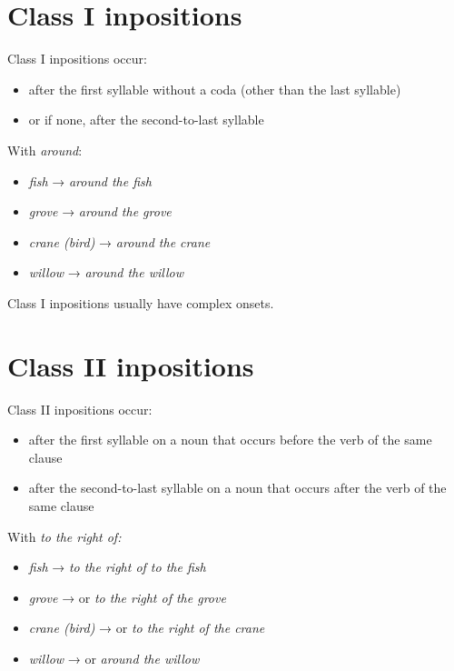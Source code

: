 \documentclass{book}
\begin{document}
\section{Class I inpositions}

Class I inpositions occur:

\begin{itemize}
  \item after the first syllable without a coda (other than the last syllable)
  \item or if none, after the second-to-last syllable
\end{itemize}

With  \emph{around}:

\begin{itemize}
  \item {} \emph{fish} →  \emph{around the fish}
  \item {} \emph{grove} →  \emph{around the grove}
  \item {} \emph{crane (bird)} →  \emph{around the crane}
  \item {} \emph{willow} →  \emph{around the willow}
\end{itemize}

Class I inpositions usually have complex onsets.

\section{Class II inpositions}

Class II inpositions occur:

\begin{itemize}
  \item after the first syllable on a noun that occurs before the verb of the same clause
  \item after the second-to-last syllable on a noun that occurs after the verb of the same clause
\end{itemize}

With  \emph{to the right of:}

\begin{itemize}
  \item {} \emph{fish} →  \emph{to the right of to the fish}
  \item {} \emph{grove} →  or  \emph{to the right of the grove}
  \item {} \emph{crane (bird)} →  or  \emph{to the right of the crane}
  \item {} \emph{willow} →  or  \emph{around the willow}
\end{itemize}
\end{document}
